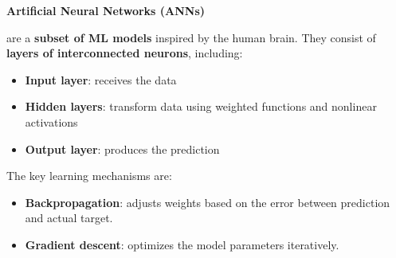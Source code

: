 \highspace
\begin{flushleft}
    \textcolor{Green3}{ \textbf{Artificial Neural Networks (ANNs)}}
\end{flushleft}
 are a \textbf{subset of ML models} inspired by the human brain. They consist of \textbf{layers of interconnected neurons}, including:
\begin{itemize}
    \item \textbf{Input layer}: receives the data
    \item \textbf{Hidden layers}: transform data using weighted functions and nonlinear activations
    \item \textbf{Output layer}: produces the prediction
\end{itemize}
The key learning mechanisms are:
\begin{itemize}
    \item \textbf{Backpropagation}: adjusts weights based on the error between prediction and actual target.
    \item \textbf{Gradient descent}: optimizes the model parameters iteratively.
\end{itemize}

